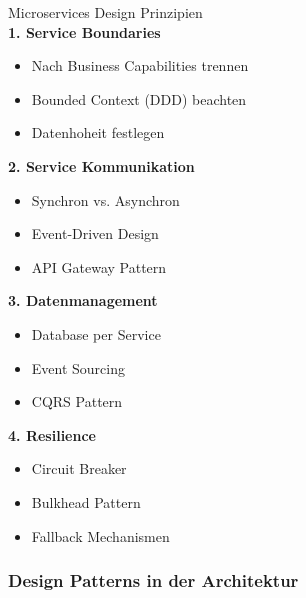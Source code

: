 \begin{KR}{Microservices Design Prinzipien}\\
\textbf{1. Service Boundaries}
\begin{itemize}
    \item Nach Business Capabilities trennen
    \item Bounded Context (DDD) beachten
    \item Datenhoheit festlegen
\end{itemize}

\textbf{2. Service Kommunikation}
\begin{itemize}
    \item Synchron vs. Asynchron
    \item Event-Driven Design
    \item API Gateway Pattern
\end{itemize}

\textbf{3. Datenmanagement}
\begin{itemize}
    \item Database per Service
    \item Event Sourcing
    \item CQRS Pattern
\end{itemize}

\textbf{4. Resilience}
\begin{itemize}
    \item Circuit Breaker
    \item Bulkhead Pattern
    \item Fallback Mechanismen
\end{itemize}
\end{KR}

\subsubsection{Design Patterns in der Architektur}

